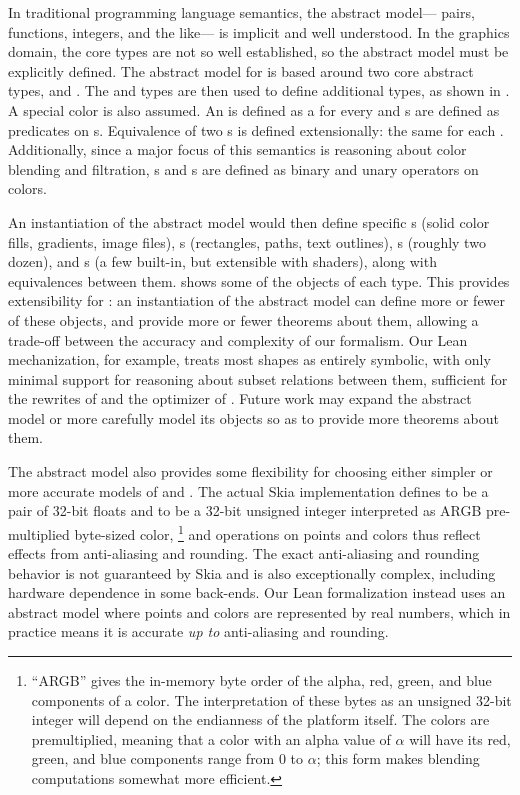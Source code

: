 \documentclass[main.tex]{subfiles}
\begin{document}
In traditional programming language semantics,
  the abstract model---%
  pairs, functions, integers, and the like---%
  is implicit and well understood.
In the graphics domain, the core types
  are not so well established,
  so the abstract model must be explicitly defined.
The abstract model for \muskia
  is based around two core abstract types,
  \Point and \Color.
The \Point and \Color types
  are then used to define additional types,
  as shown in .
A special \Transparent color is also assumed.
An \Image is defined
  as a \Color for every \Point
  and \Shape{}s are defined
  as predicates on \Point{}s.
Equivalence of two \Image{}s is defined extensionally:
  the same \Color for each \Point.
Additionally, since a major focus of this semantics
  is reasoning about color blending and filtration,
  \Blend{}s and \Filter{}s are defined
  as binary and unary operators on colors.

An instantiation of the abstract model
  would then define specific \Image{}s
  (solid color fills, gradients, image files),
  \Shape{}s (rectangles, paths, text outlines),
  \Blend{}s (roughly two dozen),
  and \Filter{}s (a few built-in, but extensible with shaders),
  along with equivalences between them.
 shows some of the objects of each type.
This provides extensibility for \muskia:
  an instantiation of the abstract model
  can define more or fewer of these objects,
  and provide more or fewer theorems about them,
  allowing a trade-off between the accuracy and complexity
  of our formalism.
Our Lean mechanization, for example,
  treats most shapes as entirely symbolic,
  with only minimal support for reasoning about
  subset relations between them,
  sufficient for the rewrites of 
  and the optimizer of .
Future work may expand the abstract model
  or more carefully model its objects
  so as to provide more theorems about them.

The abstract model also provides some flexibility
  for choosing either simpler or more accurate
  models of \Point and \Color.
The actual Skia implementation
  defines \Point to be a pair of 32-bit floats
  and \Color to be a 32-bit unsigned integer
  interpreted as ARGB pre-multiplied byte-sized color,%
\footnote{
``ARGB'' gives the in-memory byte order
  of the alpha, red, green, and blue components of a color.
The interpretation of these bytes as an unsigned 32-bit integer
  will depend on the endianness of the platform itself.
The colors are premultiplied, meaning
  that a color with an alpha value of $\alpha$
  will have its red, green, and blue components
  range from $0$ to $\alpha$;
  this form makes blending computations somewhat more efficient.
}
  and operations on points and colors
  thus reflect effects from anti-aliasing and rounding.
The exact anti-aliasing and rounding behavior
  is not guaranteed by Skia
  and is also exceptionally complex,
  including hardware dependence in some back-ends.
Our Lean formalization instead uses an abstract model
  where points and colors are represented by real numbers,
  which in practice means it is accurate
  \emph{up to} anti-aliasing and rounding.
\end{document}
